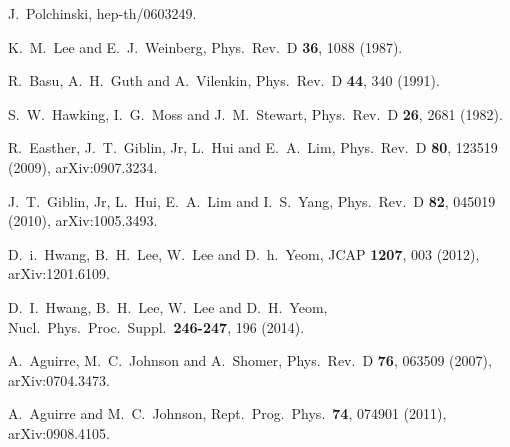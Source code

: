   J.~Polchinski,
  hep-th/0603249.

  K.~M.~Lee and E.~J.~Weinberg,
  Phys.\ Rev.\ D {\bf 36}, 1088 (1987). 

  R.~Basu, A.~H.~Guth and A.~Vilenkin,
  Phys.\ Rev.\ D {\bf 44}, 340 (1991).

  S.~W.~Hawking, I.~G.~Moss and J.~M.~Stewart,
  Phys.\ Rev.\ D {\bf 26}, 2681 (1982).

  R.~Easther, J.~T.~Giblin, Jr, L.~Hui and E.~A.~Lim,
  Phys.\ Rev.\ D {\bf 80}, 123519 (2009), 
  arXiv:0907.3234.


  J.~T.~Giblin, Jr, L.~Hui, E.~A.~Lim and I.~S.~Yang,
  Phys.\ Rev.\ D {\bf 82}, 045019 (2010), 
  arXiv:1005.3493.


  D.~i.~Hwang, B.~H.~Lee, W.~Lee and D.~h.~Yeom,
  JCAP {\bf 1207}, 003 (2012), 
  arXiv:1201.6109.

  D.~I.~Hwang, B.~H.~Lee, W.~Lee and D.~H.~Yeom,
  Nucl.\ Phys.\ Proc.\ Suppl.\  {\bf 246-247}, 196 (2014).

  A.~Aguirre, M.~C.~Johnson and A.~Shomer,
  Phys.\ Rev.\ D {\bf 76}, 063509 (2007), arXiv:0704.3473.

  A.~Aguirre and M.~C.~Johnson,
  Rept.\ Prog.\ Phys.\  {\bf 74}, 074901 (2011), 
  arXiv:0908.4105.

